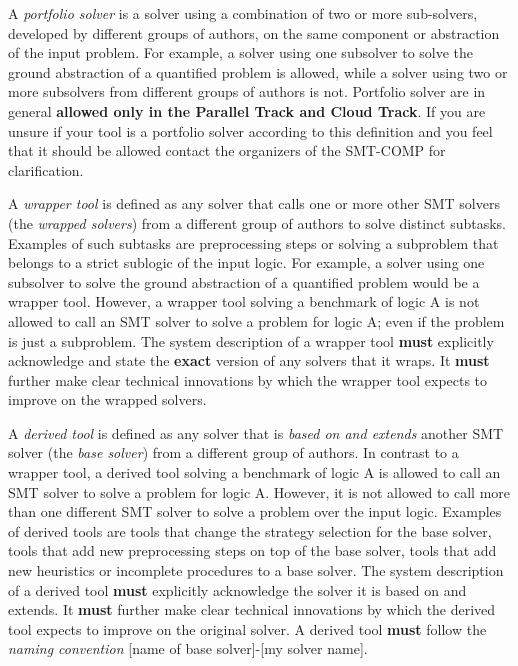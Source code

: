 \documentclass[12pt]{article}
\newcommand{\paralleltrack}{Parallel Track\xspace}
\newcommand{\cloudtrack}{Cloud Track\xspace}
\begin{document}
%
A \emph{portfolio solver} is a solver using a combination of two or
more sub-solvers, developed by different groups of authors, on the
same component or abstraction of the input problem.  For example, a
solver using one subsolver to solve the ground abstraction of a
quantified problem is allowed, while a solver using two or more
subsolvers from different groups of authors is not.
Portfolio solver are in general \textbf{allowed only in the
\paralleltrack{} and \cloudtrack{}}.
If you are unsure if your tool is a portfolio solver according to this
definition and you feel that it should be allowed contact the
organizers of the SMT-COMP for clarification.

%
A \emph{wrapper tool} is defined as any solver that calls one or more other SMT
solvers (the \emph{wrapped solvers}) from a different
group of authors to solve distinct subtasks. 
Examples of such subtasks are preprocessing steps or solving a subproblem that belongs to a strict sublogic of the input logic.
For example, a solver using one subsolver to solve the ground abstraction of a
quantified problem would be a wrapper tool.
However, a wrapper tool solving a benchmark of logic A is not allowed to call an SMT solver 
to solve a problem for logic A; even if the problem is just a subproblem.
The system description of a wrapper tool \textbf{must}
explicitly acknowledge and state the \textbf{exact} version of any solvers that
it wraps.  It \textbf{must} further make clear technical innovations by which
the wrapper tool expects to improve on the wrapped solvers.

%
A \emph{derived tool} is defined as any solver that is \emph{based on and
extends} another SMT solver (the \emph{base solver}) from a different
group of authors.  
In contrast to a wrapper tool, 
a derived tool solving a benchmark of logic A is allowed to call an SMT solver 
to solve a problem for logic A.
However, it is not allowed to call more than one different SMT solver to solve a problem over the input logic.
Examples of derived tools are tools that change the strategy selection for the base solver,
tools that add new preprocessing steps on top of the base solver,
tools that add new heuristics or incomplete procedures to a base solver.
The system description of a derived tool
\textbf{must} explicitly acknowledge
the solver it is based on and extends.  It \textbf{must} further make clear
technical innovations by which the derived tool expects to improve on the
original solver.  A derived tool \textbf{must} follow the \emph{naming convention}
{[name of base solver]-[my solver name]}.
\end{document}
